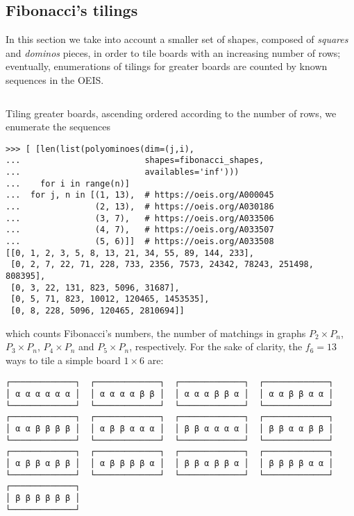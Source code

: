 \subsection{Fibonacci's tilings}

In this section we take into account a smaller set of shapes, composed of
\textit{squares} and \textit{dominos} pieces, in order to tile boards with an
increasing number of rows; eventually, enumerations of tilings for greater
boards are counted by known sequences in the OEIS.

\inputminted[baselinestretch=0.8,stripnl=false, firstline=514,lastline=530]
    {python}{backtracking/polyominoes.py}

Tiling greater boards, ascending ordered according to the
number of rows, we enumerate the sequences
\begin{verbatim}
>>> [ [len(list(polyominoes(dim=(j,i),
...                         shapes=fibonacci_shapes,
...                         availables='inf')))
...    for i in range(n)]
...  for j, n in [(1, 13),  # https://oeis.org/A000045
...               (2, 13),  # https://oeis.org/A030186
...               (3, 7),   # https://oeis.org/A033506
...               (4, 7),   # https://oeis.org/A033507
...               (5, 6)]]  # https://oeis.org/A033508
[[0, 1, 2, 3, 5, 8, 13, 21, 34, 55, 89, 144, 233],
 [0, 2, 7, 22, 71, 228, 733, 2356, 7573, 24342, 78243, 251498, 808395],
 [0, 3, 22, 131, 823, 5096, 31687],
 [0, 5, 71, 823, 10012, 120465, 1453535],
 [0, 8, 228, 5096, 120465, 2810694]]
\end{verbatim}
which counts Fibonacci's numbers, the number of matchings in graphs $P_2 \times
P_n$, $P_{3} \times P_{n}$, $P_{4} \times P_{n}$ and $P_{5} \times P_{n}$,
respectively. For the sake of clarity, the $f_{6} = 13$ ways to tile a
simple board $1\times 6$ are:
\begin{Verbatim}[baselinestretch=0.1]
┌─────────────┐  ┌─────────────┐  ┌─────────────┐  ┌─────────────┐
│ α α α α α α │  │ α α α α β β │  │ α α α β β α │  │ α α β β α α │
└─────────────┘  └─────────────┘  └─────────────┘  └─────────────┘
┌─────────────┐  ┌─────────────┐  ┌─────────────┐  ┌─────────────┐
│ α α β β β β │  │ α β β α α α │  │ β β α α α α │  │ β β α α β β │
└─────────────┘  └─────────────┘  └─────────────┘  └─────────────┘
┌─────────────┐  ┌─────────────┐  ┌─────────────┐  ┌─────────────┐
│ α β β α β β │  │ α β β β β α │  │ β β α β β α │  │ β β β β α α │
└─────────────┘  └─────────────┘  └─────────────┘  └─────────────┘
┌─────────────┐
│ β β β β β β │
└─────────────┘
\end{Verbatim}


